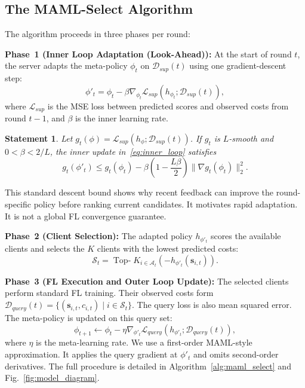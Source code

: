 \documentclass[journal]{IEEEtran}
\newtheorem{Statement}{Statement}
\newcommand{\revision}[1]{#1}
\begin{document}
\subsection{The MAML-Select Algorithm}
The algorithm proceeds in three phases per round:

\textbf{Phase~1 (Inner Loop Adaptation (Look-Ahead)):}
At the start of round $t$, \revision{the server adapts the meta-policy $\phi_t$ on $\mathcal{D}_{sup}(t)$ using one gradient-descent step:}
\begin{equation}
		\phi'_t = \phi_t - \beta \nabla_{\phi_t} \mathcal{L}_{sup}(h_{\phi_t};\mathcal{D}_{sup}(t)),
		\label{eq:inner_loop}
\end{equation}
where $\mathcal{L}_{sup}$ is the MSE loss between predicted scores and observed costs from round $t-1$, and $\beta$ is the inner learning rate.

{
\begin{Statement}
Let $g_t(\phi)=\mathcal{L}_{sup}(h_\phi;\mathcal{D}_{sup}(t))$. If $g_t$ is $L$-smooth and $0<\beta<2/L$, the inner update in~\eqref{eq:inner_loop} satisfies
\[
g_t(\phi'_t) \leq g_t(\phi_t)
-\beta\left(1-\frac{L\beta}{2}\right)
\|\nabla g_t(\phi_t)\|_2^2.
\]
\end{Statement}
This standard descent bound shows why recent feedback can improve the round-specific policy before ranking current candidates. It motivates rapid adaptation. It is not a global FL convergence guarantee.
}

\textbf{Phase~2 (Client Selection):}
\revision{The adapted policy $h_{\phi'_t}$ scores the available clients and selects the $K$ clients with the lowest predicted costs:}
\begin{equation}
	\mathcal{S}_t = \operatorname{Top-}K_{i \in \mathcal{A}_t} \left( -h_{\phi'_t}(\bm{s}_{i,t}) \right).
	\label{eq:selection}
\end{equation}

\textbf{Phase~3 (FL Execution and Outer Loop Update):}
\revision{The selected clients perform standard FL training. Their observed costs form $\mathcal{D}_{query}(t)=\{(\bm{s}_{i,t},c_{i,t})\mid i\in\mathcal{S}_t\}$. The query loss is also mean squared error. The meta-policy is updated on this query set:}
\begin{equation}
		\phi_{t+1} \leftarrow \phi_t - \eta \nabla_{\phi'_t} \mathcal{L}_{query}(h_{\phi'_t}; \mathcal{D}_{query}(t)),
		\label{eq:outer_loop}
\end{equation}
\revision{where $\eta$ is the meta-learning rate. We use a first-order MAML-style approximation. It applies the query gradient at $\phi'_t$ and omits second-order derivatives. The full procedure is detailed in Algorithm~\ref{alg:maml_select} and Fig.~\ref{fig:model_diagram}.}
\end{document}
